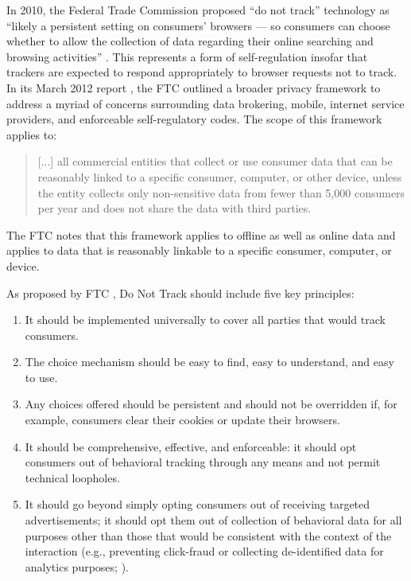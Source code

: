 In 2010, the Federal Trade Commission proposed ``do not track'' technology as ``likely a persistent setting on consumers' browsers --- so consumers can choose whether to allow the collection of data regarding their online searching and browsing activities''  \citep{Anonymous:2010ti}.  This represents a form of self-regulation insofar that trackers are expected to respond appropriately to browser requests not to track. In its March 2012 report  \cite{Staff:2012th},  the FTC outlined a broader privacy framework to address a myriad of concerns surrounding data brokering, mobile, internet service providers, and enforceable self-regulatory codes. The scope of this framework applies to:

\begin{quote}
[...] all commercial entities that collect or use consumer data that can be reasonably linked to a specific consumer, computer, or other device, unless the entity collects only non-sensitive data from fewer than 5,000 consumers per year and does not share the data with third parties. \citep{Staff:2012th}
\end{quote}

The FTC notes that this framework applies to offline as well as online data and applies to data that is reasonably linkable to a specific consumer, computer, or device.

As proposed by FTC  \citep{Staff:2012th},  Do Not Track should include five key principles:

\begin{enumerate}
\item It should be implemented universally to cover all parties that would track consumers. 
\item The choice mechanism should be easy to find, easy to understand, and easy to use. 
\item Any choices offered should be persistent and should not be overridden if, for example, consumers clear their cookies or update their browsers.
\item It should be comprehensive, effective, and enforceable: it should opt consumers out of behavioral tracking through any means and not permit technical loopholes.
\item It should go beyond simply opting consumers out of receiving targeted advertisements; it should opt them out of collection of behavioral data for all purposes other than those that would be consistent with the context of the interaction (e.g., preventing click-fraud or collecting de-identified data for analytics purposes; \citealp{Staff:2012th}).
\end{enumerate}


